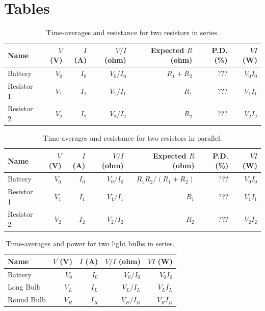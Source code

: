 \section{Tables}
%
\begin{table}[ht]
	\begin{center}
		\begin{tabular}{|l|r|r|r|r|r|r|}
			\hline
			Name & $V$ (V) & $I$ (A) & $V/I$ (ohm) & Expected $R$ (ohm) & P.D. (\%) & $V I$ (W) \\
			\hline
			Battery & $V_{0}$ & $I_{0}$ & $V_{0} / I_{0}$ & $R_{1} + R_{2}$ & ??? & $V_{0} I_{0}$ \\
			Resistor 1 & $V_{1}$ & $I_{1}$ & $V_{1} / I_{1}$ & $R_{1}$ & ??? & $V_{1} I_{1}$ \\
			Resistor 2 & $V_{2}$ & $I_{2}$ & $V_{2} / I_{2}$ & $R_{2}$ & ??? & $V_{2} I_{2}$ \\
			\hline
		\end{tabular}
	\end{center}
	\caption{Time-averages and resistance for two resistors in series.}
	\label{table.03.resistors.series}
\end{table}
%
\begin{table}[ht]
	\begin{center}
		\begin{tabular}{|l|r|r|r|r|r|r|}
			\hline
			Name & $V$ (V) & $I$ (A) & $V/I$ (ohm) & Expected $R$ (ohm) & P.D. (\%) & $V I$ (W) \\
			\hline
			Battery & $V_{0}$ & $I_{0}$ & $V_{0} / I_{0}$ & $R_{1} R_{2} / (R_{1} + R_{2})$ & ??? & $V_{0} I_{0}$ \\
			Resistor 1 & $V_{1}$ & $I_{1}$ & $V_{1} / I_{1}$ & $R_{1}$ & ??? & $V_{1} I_{1}$ \\
			Resistor 2 & $V_{2}$ & $I_{2}$ & $V_{2} / I_{2}$ & $R_{2}$ & ??? & $V_{2} I_{2}$ \\
			\hline
		\end{tabular}
	\end{center}
	\caption{Time-averages and resistance for two resistors in parallel.}
	\label{table.03.resistors.parallel}
\end{table}
%
\begin{table}[ht]
	\begin{center}
		\begin{tabular}{|l|r|r|r|r|}
			\hline
			Name & $V$ (V) & $I$ (A) & $V/I$ (ohm) & $V I$ (W) \\
			\hline
			Battery & $V_{0}$ & $I_{0}$ & $V_{0} / I_{0}$ & $V_{0} I_{0}$ \\
			Long Bulb & $V_{L}$ & $I_{L}$ & $V_{L} / I_{L}$ & $V_{L} I_{L}$ \\
			Round Bulb & $V_{R}$ & $I_{R}$ & $V_{R} / I_{R}$ & $V_{R} I_{R}$ \\
			\hline
		\end{tabular}
	\end{center}
	\caption{Time-averages and power for two light bulbs in series.}
	\label{table.03.bulbs.series}
\end{table}

